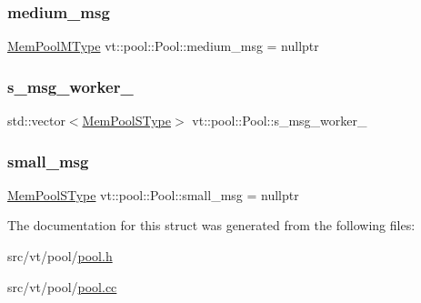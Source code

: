 \subsubsection{\texorpdfstring{medium\+\_\+msg}{medium\_msg}}
{\footnotesize\ttfamily \hyperlink{structvt_1_1pool_1_1_pool_a8a201b9a843e47cd4e7b568a8e4483da}{Mem\+Pool\+M\+Type} vt\+::pool\+::\+Pool\+::medium\+\_\+msg = nullptr\hspace{0.3cm}{\ttfamily [private]}}

\mbox{\label{structvt_1_1pool_1_1_pool_a9551faed42cf337990287481e158b01e}} 
\subsubsection{\texorpdfstring{s\+\_\+msg\+\_\+worker\+\_\+}{s\_msg\_worker\_}}
{\footnotesize\ttfamily std\+::vector$<$\hyperlink{structvt_1_1pool_1_1_pool_a9f94985824d12c43357cfe50eaaefd38}{Mem\+Pool\+S\+Type}$>$ vt\+::pool\+::\+Pool\+::s\+\_\+msg\+\_\+worker\+\_\+\hspace{0.3cm}{\ttfamily [private]}}

\mbox{\label{structvt_1_1pool_1_1_pool_a8f14f2f9b344882cf727200eb8d41845}} 
\subsubsection{\texorpdfstring{small\+\_\+msg}{small\_msg}}
{\footnotesize\ttfamily \hyperlink{structvt_1_1pool_1_1_pool_a9f94985824d12c43357cfe50eaaefd38}{Mem\+Pool\+S\+Type} vt\+::pool\+::\+Pool\+::small\+\_\+msg = nullptr\hspace{0.3cm}{\ttfamily [private]}}



The documentation for this struct was generated from the following files\+:\begin{DoxyCompactItemize}
\item 
src/vt/pool/\hyperlink{pool_8h}{pool.\+h}\item 
src/vt/pool/\hyperlink{pool_8cc}{pool.\+cc}\end{DoxyCompactItemize}
